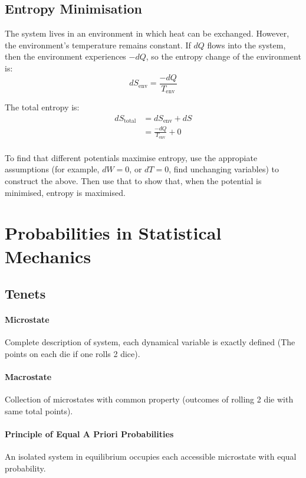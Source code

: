 \documentclass[12pt]{article}
\begin{document}
\subsection{Entropy Minimisation}
The system lives in an environment in which heat can be exchanged. However, the environment's temperature remains constant. If $dQ$ flows into the system, then the environment experiences $-dQ$, so the entropy change of the environment is:
\[ dS_\text{env} = \frac{-dQ}{T_\text{env}}\]

The total entropy is:
\begin{align*}
    dS_\text{total} &= dS_\text{env} + dS\\
    &= \frac{-dQ}{T_\text{env}}+0\\
\end{align*}

To find that different potentials maximise entropy, use the appropiate assumptions (for example, $dW = 0$, or $dT = 0$, find unchanging variables) to construct the above. Then use that to show that, when the potential is minimised, entropy is maximised.


\section{Probabilities in Statistical Mechanics}

\subsection{Tenets}

\paragraph{Microstate}

Complete description of system, each dynamical variable is exactly defined (The points on each die if one rolls 2 dice).

\paragraph{Macrostate}
Collection of microstates with common property (outcomes of rolling 2 die with same total points).

\paragraph{Principle of Equal A Priori Probabilities}
An isolated system in equilibrium occupies each accessible microstate with equal probability.
 
\end{document}
